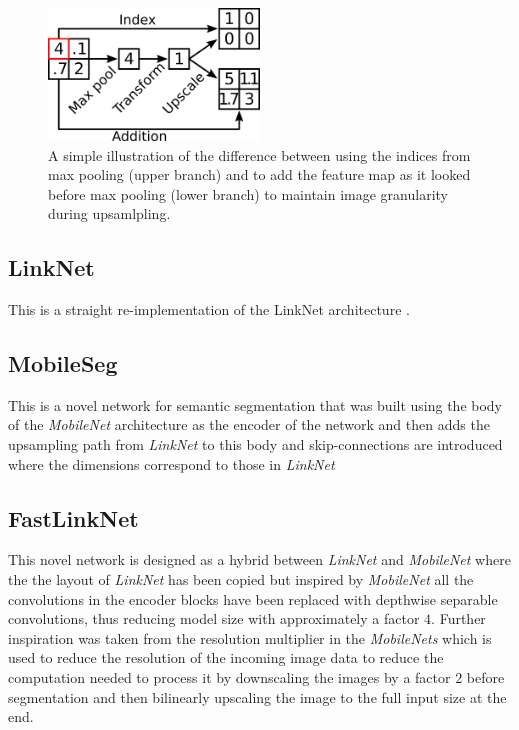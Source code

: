 \documentclass{kththesis}
\begin{document}
\begin{figure}[h]
  \centering
  \includegraphics[width=0.5\textwidth]{upscale}
  \caption{A simple illustration of the difference between using the indices
    from max pooling (upper branch) and to add the feature map as it looked
    before max pooling (lower branch)
    to maintain image granularity during upsamlpling.}
  \label{fig:upscale}
\end{figure}

\subsection*{LinkNet}
This is a straight re-implementation of the LinkNet architecture \parencite{chaurasia2017linknet}.

\subsection*{MobileSeg}
This is a novel network for semantic segmentation that was built using the body of the
\textit{MobileNet} architecture \parencite{howard2017mobilenets} as the encoder of the network and then adds the
upsampling path from \textit{LinkNet} to this body and skip-connections are
introduced where the dimensions correspond to those in \textit{LinkNet}

\subsection*{FastLinkNet}
This novel network is designed as a hybrid between \textit{LinkNet} and
\textit{MobileNet} where the the layout of \textit{LinkNet} has been copied but
inspired by \textit{MobileNet} all the convolutions in the encoder blocks have
been replaced with depthwise separable convolutions, thus reducing model size
with approximately a factor \(4\).
Further inspiration was taken from the resolution
multiplier in the \textit{MobileNets} which is used to reduce the resolution of
the incoming image data to reduce the computation needed to process it by
downscaling the images by a factor \(2\) before segmentation and then bilinearly
upscaling the image to the full input size at the end.
\end{document}
